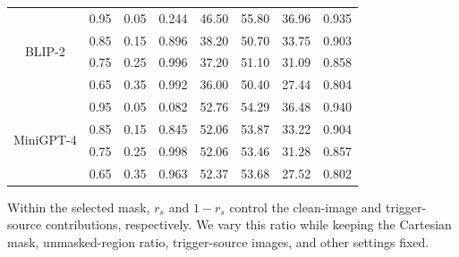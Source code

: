 \documentclass[lettersize,journal]{IEEEtran}
\begin{document}
\begin{minipage}{\columnwidth}
{\begin{tabular}{c|cc|ccc|cc}
\multirow{4}{*}{BLIP-2}
& 0.95 & 0.05 & 0.244 & 46.50 & 55.80 & 36.96 & 0.935 \\
& 0.85 & 0.15 & 0.896 & 38.20 & 50.70 & 33.75 & 0.903 \\
& 0.75 & 0.25 & 0.996 & 37.20 & 51.10 & 31.09 & 0.858 \\
& 0.65 & 0.35 & 0.992 & 36.00 & 50.40 & 27.44 & 0.804 \\
\hline

\multirow{4}{*}{MiniGPT-4}
& 0.95 & 0.05 & 0.082 & 52.76 & 54.29 & 36.48 & 0.940 \\
& 0.85 & 0.15 & 0.845 & 52.06 & 53.87 & 33.22 & 0.904 \\
& 0.75 & 0.25 & 0.998 & 52.06 & 53.46 & 31.28 & 0.857 \\
& 0.65 & 0.35 & 0.963 & 52.37 & 53.68 & 27.52 & 0.802 \\
\hline

\end{tabular}
}%
\end{minipage}
\par\medskip

Within the selected mask, $r_s$ and $1-r_s$ control the clean-image and trigger-source contributions, respectively. We vary this ratio while keeping the Cartesian mask, unmasked-region ratio, trigger-source images, and other settings fixed.

\end{document}
